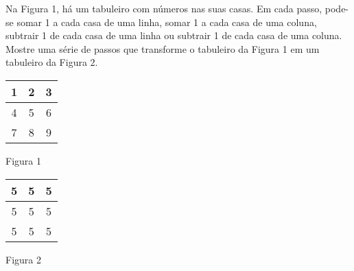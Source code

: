 Na Figura 1, há um tabuleiro com números nas suas casas. Em cada passo, pode-se somar 1 a cada casa de uma linha, somar 1 a cada casa de uma coluna, subtrair 1 de cada casa de uma linha ou subtrair 1 de cada casa de uma coluna. Mostre uma série de passos que transforme o tabuleiro da Figura 1 em um tabuleiro da Figura 2.

\vspace{1ex}

\noindent
\begin{center}
\begin{minipage}{.4\textwidth}
	\begin{center}
		\begin{tabular}{|c|c|c|}
			\hline
			1 & 2 & 3 \\
			\hline
			4 & 5 & 6 \\
			\hline
			7 & 8 & 9 \\
			\hline
		\end{tabular}

		\vspace{1ex} Figura 1
	\end{center}
\end{minipage}
\begin{minipage}{.4\textwidth}
	\begin{center}
		\begin{tabular}{|c|c|c|}
			\hline
			5 & 5 & 5 \\
			\hline
			5 & 5 & 5 \\
			\hline
			5 & 5 & 5 \\
			\hline
		\end{tabular}

		\vspace{1ex} Figura 2
	\end{center}
\end{minipage}
\end{center}
